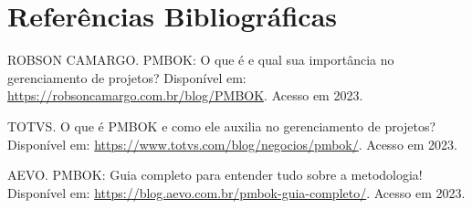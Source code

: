 \documentclass[
	12pt,				%
	openright,			%
	twoside,			%
	a4paper,			%
	english,			%
	brazil				%
	]{abntex2}
\begin{document}
\chapter{Referências Bibliográficas}

\begin{thebibliography}{99}
    
    ROBSON CAMARGO. PMBOK: O que é e qual sua importância no gerenciamento de projetos? Disponível em: \url{https://robsoncamargo.com.br/blog/PMBOK}. Acesso em 2023.

    TOTVS. O que é PMBOK e como ele auxilia no gerenciamento de projetos? Disponível em: \url{https://www.totvs.com/blog/negocios/pmbok/}. Acesso em 2023.

    AEVO. PMBOK: Guia completo para entender tudo sobre a metodologia! Disponível em: \url{https://blog.aevo.com.br/pmbok-guia-completo/}. Acesso em 2023.

\end{thebibliography}





%
%


\printindex
\end{document}

